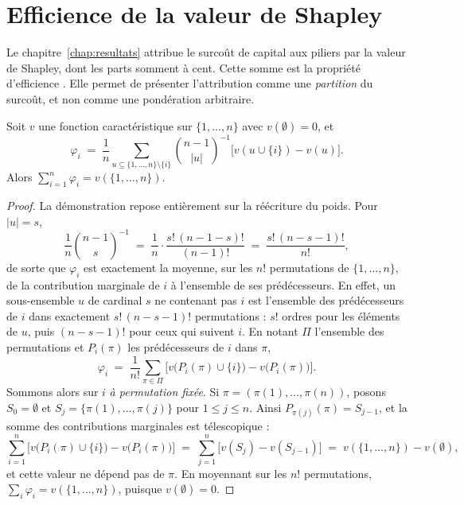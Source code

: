 \section*{Efficience de la valeur de Shapley}
\label{sec:ann-efficience-shapley}

Le chapitre~\ref{chap:resultats} attribue le surcoût de capital aux piliers par la valeur de
Shapley, dont les parts somment à cent. Cette somme est la propriété d'efficience
\citep{Shapley1953}. Elle permet de présenter l'attribution comme une \emph{partition} du surcoût,
et non comme une pondération arbitraire.

\begin{proposition}[Efficience]
\label{prop:efficience}
Soit $v$ une fonction caractéristique sur $\{1,\dots,n\}$ avec $v(\emptyset)=0$, et
\[
  \varphi_i \;=\; \frac1n \sum_{u \subseteq \{1,\dots,n\}\setminus\{i\}} \binom{n-1}{|u|}^{-1}
                  \bigl[v(u \cup \{i\}) - v(u)\bigr].
\]
Alors $\sum_{i=1}^{n} \varphi_i = v(\{1,\dots,n\})$.
\end{proposition}

\begin{proof}
La démonstration repose entièrement sur la réécriture du poids. Pour $|u|=s$,
\begin{equation}
  \frac1n \binom{n-1}{s}^{-1} \;=\; \frac1n \cdot \frac{s!\,(n-1-s)!}{(n-1)!}
  \;=\; \frac{s!\,(n-s-1)!}{n!},
  \label{eq:poids-shapley}
\end{equation}
de sorte que $\varphi_i$ est exactement la moyenne, sur les $n!$ permutations de
$\{1,\dots,n\}$, de la contribution marginale de $i$ à l'ensemble de ses prédécesseurs. En effet,
un sous-ensemble $u$ de cardinal $s$ ne contenant pas $i$ est l'ensemble des prédécesseurs de $i$
dans exactement $s!\,(n-s-1)!$ permutations : $s!$ ordres pour les éléments de $u$, puis
$(n-s-1)!$ pour ceux qui suivent $i$. En notant $\Pi$ l'ensemble des permutations et $P_i(\pi)$
les prédécesseurs de $i$ dans $\pi$,
\[
  \varphi_i \;=\; \frac{1}{n!} \sum_{\pi \in \Pi}
              \bigl[v\bigl(P_i(\pi) \cup \{i\}\bigr) - v\bigl(P_i(\pi)\bigr)\bigr].
\]
Sommons alors sur $i$ \emph{à permutation fixée}. Si $\pi = (\pi(1),\dots,\pi(n))$, posons $S_0=\emptyset$ et $S_j=\{\pi(1),\dots,\pi(j)\}$ pour $1\le j\le n$. Ainsi $P_{\pi(j)}(\pi)=S_{j-1}$, et la somme des contributions marginales est télescopique :
\[
  \sum_{i=1}^{n} \bigl[v\bigl(P_i(\pi)\cup\{i\}\bigr)-v\bigl(P_i(\pi)\bigr)\bigr]
  \;=\; \sum_{j=1}^{n} \bigl[v(S_j)-v(S_{j-1})\bigr]
  \;=\; v(\{1,\dots,n\}) - v(\emptyset),
\]
et cette valeur ne dépend pas de $\pi$. En moyennant sur les $n!$ permutations,
$\sum_i \varphi_i = v(\{1,\dots,n\})$, puisque $v(\emptyset)=0$.
\end{proof}

